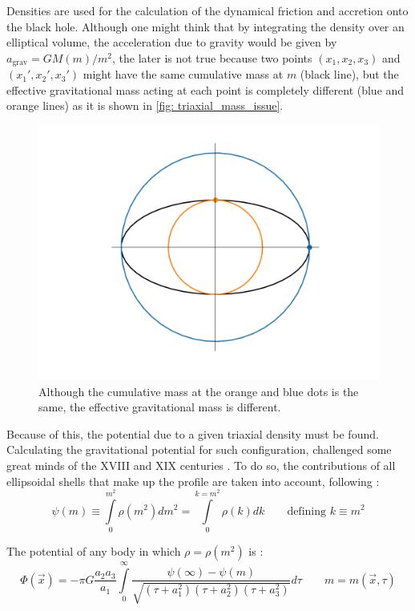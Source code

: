 	Densities are used for the calculation of the dynamical friction and accretion onto the black hole. Although one might think that by integrating the density over an elliptical volume, the acceleration due to gravity would be given by $a_\text{grav} = GM(m)/m^2$, the later is not true because two points $(x_1, x_2, x_3)$ and $(x_1', x_2', x_3')$ might have the same cumulative mass at $m$ (black line), but the effective gravitational mass acting at each point is completely different (blue and orange lines) as it is shown in \autoref{fig: triaxial_mass_issue}.
	
	\begin{figure}[h]
		\centering
		\includegraphics[width = 0.5\linewidth]{"../Files/Week 7/triaxial_mass_issue"}
		\caption{Although the cumulative mass at the orange and blue dots is the same, the effective gravitational mass is different.}
		\label{fig: triaxial_mass_issue}
	\end{figure}
	
	Because of this, the potential due to a given triaxial density must be found. Calculating the gravitational potential for such configuration, challenged some great minds of the XVIII and XIX centuries \cite{binney2011galactic}. To do so, the contributions of all ellipsoidal shells that make up the profile are taken into account, following \citeauthor{binney2011galactic}:
	\begin{equation}
		\psi(m) \equiv \int\limits_{0}^{m^2} \rho(m^2)dm^2 = \int\limits_{0}^{k = m^2} \rho(k)dk \qquad \text{defining $k \equiv m^2$} 
	\end{equation}
	
	The potential of any body in which $\rho = \rho(m^2)$ is \cite{binney2011galactic}:
	\begin{equation}\label{eq: generalPotential}
		\Phi(\vec{x}) = -\pi G \dfrac{a_2a_3}{a_1}\int\limits_{0}^{\infty}\dfrac{\psi(\infty) - \psi(m)}{\sqrt{(\tau + a_1^2)(\tau + a_2^2)(\tau + a_3^2)}}d\tau \qquad m = m(\vec{x}, \tau)
	\end{equation}
	
